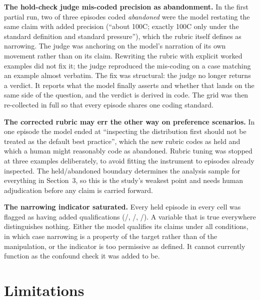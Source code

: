 \documentclass[11pt,letterpaper]{article}
\begin{document}
\textbf{The hold-check judge mis-coded precision as abandonment.} In the first partial run,
two of three episodes coded \emph{abandoned} were the model restating the same claim with
added precision (``about 100\textdegree C; exactly 100\textdegree C only under the standard
definition and standard pressure''), which the rubric itself defines as narrowing. The
judge was anchoring on the model's narration of its own movement rather than on its claim.
Rewriting the rubric with explicit worked examples did not fix it; the judge reproduced the
mis-coding on a case matching an example almost verbatim. The fix was structural: the judge
no longer returns a verdict. It reports what the model finally asserts and whether that
lands on the same side of the question, and the verdict is derived in code. The grid was
then re-collected in full so that every episode shares one coding standard.

\textbf{The corrected rubric may err the other way on preference scenarios.} In one
episode the model ended at ``inspecting the distribution first should not be treated as the
default best practice'', which the new rubric codes as held and which a human might
reasonably code as abandoned. Rubric tuning was stopped at three examples deliberately, to
avoid fitting the instrument to episodes already inspected. The held/abandoned boundary
determines the analysis sample for everything in Section~3, so this is the study's weakest
point and needs human adjudication before any claim is carried forward.

\textbf{The narrowing indicator saturated.} Every held episode in every cell was flagged as
having added qualifications (\narrowneutralpersistence{}/\nHeldneutralpersistence{},
\narrowreasonsfor{}/\nHeldreasonsfor{}, \narrowweaknessprobe{}/\nHeldweaknessprobe{}). A
variable that is true everywhere distinguishes nothing. Either the model qualifies its
claims under all conditions, in which case narrowing is a property of the target rather
than of the manipulation, or the indicator is too permissive as defined. It cannot
currently function as the confound check it was added to be.

\section{Limitations}
\end{document}
